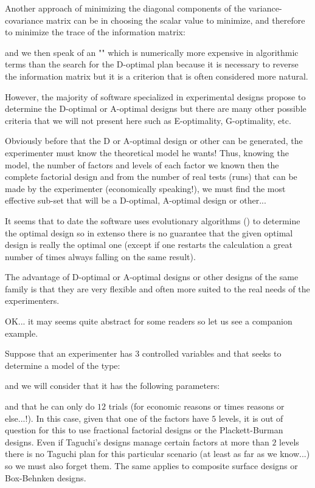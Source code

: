 	Another approach of minimizing the diagonal components of the variance-covariance matrix can be in choosing the scalar value to minimize, and therefore to minimize the trace of the information matrix:
	
 	and we then speak of an "" which is numerically more expensive in algorithmic terms than the search for the D-optimal plan because it is necessary to reverse the information matrix but it is a criterion that is often considered more natural.

	However, the majority of software specialized in experimental designs propose to determine the D-optimal or A-optimal designs but there are many other possible criteria that we will not present here such as E-optimality, G-optimality, etc.

	Obviously before that the D or A-optimal design or other can be generated, the experimenter must know the theoretical model he wants! Thus, knowing the model, the number of factors and levels of each factor we known then the complete factorial design and from the number of real tests (runs) that can be made by the experimenter (economically speaking!), we must find the most effective sub-set that will be a D-optimal, A-optimal design or other...

	It seems that to date the software uses evolutionary algorithms () to determine the optimal design so in extenso there is no guarantee that the given optimal design is really the optimal one (except if one restarts the calculation a great number of times always falling on the same result).

	The advantage of D-optimal or A-optimal designs or other designs of the same family is that they are very flexible and often more suited to the real needs of the experimenters.
	
	OK... it may seems quite abstract for some readers so let us see a companion example.
	
	Suppose that an experimenter has $3$ controlled variables and that seeks to determine a model of the type:
	
 	and we will consider that it has the following parameters:
	
	and that he can only do $12$ trials (for economic reasons or times reasons or else...!). In this case, given that one of the factors have $5$ levels, it is out of question for this to use fractional factorial designs or the Plackett-Burman designs. Even if Taguchi's designs manage certain factors at more than $2$ levels there is no Taguchi plan for this particular scenario (at least as far as we know...) so we must also forget them. The same applies to composite surface designs or Box-Behnken designs.

